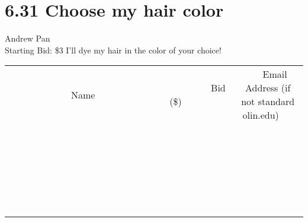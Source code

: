 \documentclass[11pt]{article}
\begin{document}
\section*{6.31 Choose my hair color}
Andrew Pan
\\
Starting Bid: \$3
\newline
I'll dye my hair in the color of your choice!
\\[6ex]
\begin{tabular}{c c c}
~~~~~~~~~~~~~Name~~~~~~~~~~~~~ & ~~~~~~~~~Bid (\$)~~~~~~~~~  & ~~~Email Address (if not standard olin.edu)~~~\\
 & & \\
\hline
 & & \\
\hline
 & & \\
\hline
 & & \\
\hline
 & & \\
\hline
 & & \\
\hline
 & & \\
\hline
 & & \\
\hline
 & & \\
\hline
 & & \\
\hline
 & & \\
\hline
 & & \\
\hline
 & & \\
\hline
 & & \\
\hline
 & & \\
\hline
 & & \\
\hline
 & & \\
\hline
 & & \\
\hline
 & & \\
\hline
 & & \\
\hline
 & & \\
\hline
 & & \\
\hline
 & & \\
\hline
 & & \\
\hline
 & & \\
\hline
 & & \\
\hline
\end{tabular}
\newpage
\end{document}
